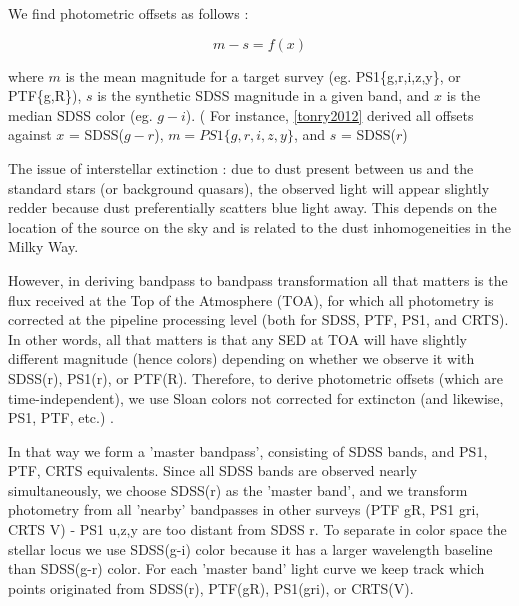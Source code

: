\documentclass[fleqn,usenatbib]{mnras}  %
\begin{document}
We find photometric offsets as follows : 

\begin{equation}
m - s = f(x)
\end{equation}

where $m$ is the mean magnitude for a target survey (eg. PS1\{g,r,i,z,y\}, or PTF\{g,R\}),  $s$ is the synthetic SDSS magnitude in a given band, and $x$ is the median SDSS color (eg. $g-i$).   ( For instance, \ref{tonry2012} derived all offsets against $x$ = SDSS($g-r$), $m = PS1 \{g,r,i,z,y\}$, and $s$ = SDSS($r$)



The issue of interstellar extinction : due to dust present between us and the standard stars (or background quasars), the observed light will appear slightly redder because dust preferentially scatters blue light away. This depends on the location of the source on the  sky and is related to the dust inhomogeneities in the Milky Way. 

However, in deriving bandpass to bandpass transformation all that matters is the flux received at the Top of the Atmosphere (TOA), for which all photometry is corrected at the pipeline processing level (both for SDSS,  PTF, PS1, and CRTS). In other words, all that matters is that any SED at TOA will have slightly different magnitude (hence colors) depending on whether we observe it with SDSS(r),  PS1(r), or PTF(R).  Therefore, to derive photometric offsets (which are time-independent), we use Sloan colors not corrected for extincton (and likewise, PS1, PTF, etc.) .  

In that way we form a 'master bandpass', consisting of SDSS bands, and PS1, PTF, CRTS equivalents.  Since all SDSS bands are observed nearly simultaneously, we choose SDSS(r) as the 'master band', and we transform photometry from all 'nearby' bandpasses in other surveys (PTF gR,  PS1 gri, CRTS V) - PS1 u,z,y are too distant from SDSS r. To separate in color space the stellar locus we use SDSS(g-i) color because it has a larger wavelength baseline than SDSS(g-r) color.  For each 'master band' light curve we keep track which points originated from SDSS(r),  PTF(gR), PS1(gri), or CRTS(V). 



\end{document}

